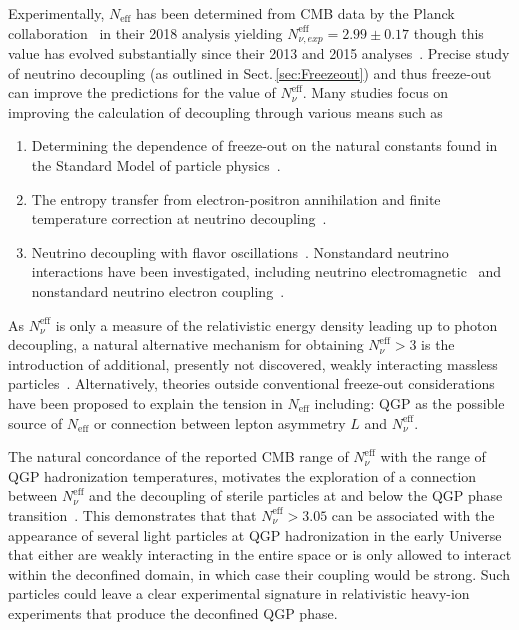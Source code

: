 \documentclass[universe,article,submit,moreauthors,pdftex,a4paper]{Definitions/mdpi}
\newcommand*{\rsec}[1]{Sect.\,{\ref{#1}}}
\begin{document}
Experimentally, $N_\mathrm{eff}$ has been determined from CMB data by the Planck collaboration~\cite{Planck:2018vyg} in their 2018 analysis yielding $N_{\nu, exp}^{\mathrm{eff}}=2.99\pm0.17$ though this value has evolved substantially since their 2013 and 2015 analyses~\cite{Planck:2013pxb,Planck:2015fie}. Precise study of neutrino decoupling (as outlined in \rsec{sec:Freezeout}) and thus freeze-out can improve the predictions for the value of $N_\nu^{\mathrm{eff}}$. Many studies focus on improving the calculation of decoupling through various means such as
\begin{enumerate}
    \item Determining the dependence of freeze-out on the natural constants found in the Standard Model of particle physics~\cite{Birrell:2014uka,Birrell:2014ona}.
    \item The entropy transfer from electron-positron annihilation and finite temperature correction at neutrino decoupling~\cite{Dicus:1982bz,Heckler:1994tv,Fornengo:1997wa}.
    \item Neutrino decoupling with flavor oscillations~\cite{Mangano:2001iu,Mangano:2005cc}. Nonstandard neutrino interactions have been investigated, including neutrino electromagnetic~\cite{Morgan:1981zy,Fukugita:1987uy,Elmfors:1997tt,Vogel:1989iv,Mangano:2006ar,Giunti:2008ve} and nonstandard neutrino electron coupling~\cite{Mangano:2006ar}.
\end{enumerate}
As $N_\nu^\mathrm{eff}$ is only a measure of the relativistic energy density leading up to photon decoupling, a natural alternative mechanism for obtaining $N_\nu^\mathrm{eff}>3$ is the introduction of additional, presently not discovered, weakly interacting massless particles~\cite{Anchordoqui:2011nh,Abazajian:2012ys,Anchordoqui:2012qu,Steigman:2013yua,Giusarma:2014zza}. Alternatively, theories outside conventional freeze-out considerations have been proposed to explain the tension in $N_\mathrm{eff}$ including: QGP as the possible source of $N_\mathrm{eff}$ or connection between lepton asymmetry $L$ and $N_\nu^{\mathrm{eff}}$.

The natural concordance of the reported CMB range of $N_\nu^{\mathrm{eff}}$ with the range of QGP hadronization temperatures, motivates the exploration of a connection between $N_\nu^{\mathrm{eff}}$ and the decoupling of sterile particles at and below the QGP phase transition~\cite{Birrell:2014cja}. This demonstrates that that $N_\nu^{\mathrm{eff}}>3.05$ can be associated with the appearance of several light particles at QGP hadronization in the early Universe that either are weakly interacting in the entire space or is only allowed to interact within the deconfined domain, in which case their coupling would be strong. Such particles could leave a clear experimental signature in relativistic heavy-ion experiments that produce the deconfined QGP phase.
\end{document}
